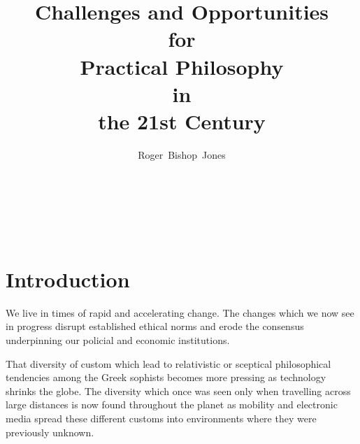 \documentclass[14pt,titlepage]{extarticle}
\title{Challenges and Opportunities \\ for \\ Practical Philosophy \\ in \\ the 21st Century}
\author{Roger~Bishop~Jones}
\date{\ }
\newcommand{\ignore}[1]{}
\begin{document}

                               
\begin{titlepage}
\maketitle





\end{titlepage}

\ \

\ignore{
\begin{centering}
  {\LARGE \bf Challenges and Opportunities \\
    for \\
    Practical Philosophy \\
    in \\
    the 21st Century}
\end{centering}
}%

\setcounter{tocdepth}{1}
{\parskip-0pt\tableofcontents}




\section{Introduction}

We live in times of rapid and accelerating change.
The changes which we now see in progress disrupt established ethical norms and erode the consensus underpinning our policial and economic institutions.

That diversity of custom which lead to relativistic or sceptical philosophical tendencies among the Greek sophists becomes more pressing as technology shrinks the globe.
The diversity which once was seen only when travelling across large distances is now found throughout the planet as mobility and electronic media spread these different customs into environments where they were previously unknown.
\end{document}

